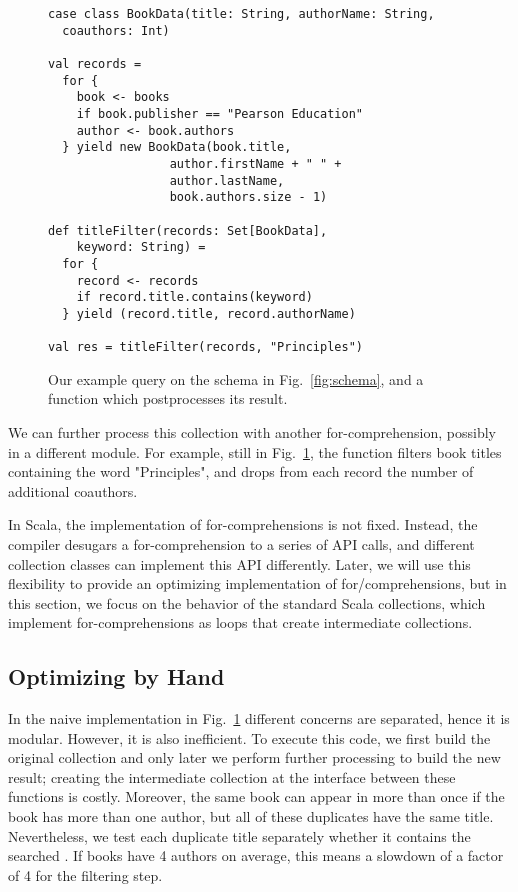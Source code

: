 \begin{figure}[t]
\centering
\begin{lstlisting}
case class BookData(title: String, authorName: String,
  coauthors: Int)

val records =
  for {
    book <- books
    if book.publisher == "Pearson Education"
    author <- book.authors
  } yield new BookData(book.title,
                 author.firstName + " " +
                 author.lastName,
                 book.authors.size - 1)

def titleFilter(records: Set[BookData],
    keyword: String) =
  for {
    record <- records
    if record.title.contains(keyword)
  } yield (record.title, record.authorName)

val res = titleFilter(records, "Principles")
\end{lstlisting}
\caption{Our example query on the schema in Fig.~\ref{fig:schema}, and a function which postprocesses its result.}
\label{fig:query}
\end{figure}

We can further process this collection with another for-comprehension, possibly
in a different module. For example, still in Fig.~\ref{fig:query}, the function
 filters book titles containing the word "Principles", and
drops from each record the number of additional coauthors.

In Scala, the implementation of for-comprehensions is not fixed. Instead, the
compiler desugars a for-comprehension to a series of API calls, and different
collection classes can implement this API differently. Later, we will use this
flexibility to provide an optimizing implementation of for\-/comprehensions, but
in this section, we focus on the behavior of the standard Scala collections,
which implement for-comprehensions as loops that create intermediate
collections.

\subsection{Optimizing by Hand}

In the naive implementation in Fig.~\ref{fig:query} different concerns are separated, hence it is modular. However, it is also inefficient.
To execute this code, we first build the original collection and
only later we perform further processing to build the new result; creating the
intermediate collection at the interface between these functions is costly.
Moreover, the same book can appear in  more than once if the book has more than one author, but all of these duplicates have the same title. Nevertheless, we test each duplicate title separately whether it contains the searched . If books have 4 authors on average, this means a slowdown of a factor of 4 for the filtering step.

